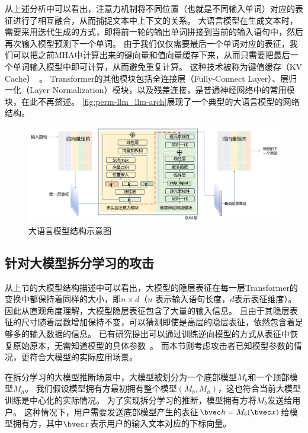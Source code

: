从上述分析中可以看出，注意力机制将不同位置（也就是不同输入单词）对应的表征进行了相互融合，从而捕捉文本中上下文的关系。
%
大语言模型在生成文本时，需要采用迭代生成的方式，即将前一轮的输出单词拼接到当前的输入语句中，然后再次输入模型预测下一个单词。
%
由于我们仅仅需要最后一个单词对应的表征，我们可以把之前MHA中计算出来的键向量和值向量缓存下来，从而只需要把最后一个单词输入模型中即可计算，从而避免重复计算。
%
这种技术被称为键值缓存（KV Cache）~\cite{pope_2023_efficiently_kv_cache}。
%
Transformer的其他模块包括全连接层（Fully-Connect Layer）、层归一化（Layer Normalization）模块，以及残差连接，是普通神经网络中的常用模块，在此不再赘述。
%
\autoref{fig:perm-llm_llm-arch}展现了一个典型的大语言模型的网络结构。

\begin{figure}[htbp]
    \centering
    \includegraphics[width=\linewidth]{Z_Resources/perm-llm_llm-architecture.png}
    \caption{大语言模型结构示意图}
    \label{fig:perm-llm_llm-arch}
\end{figure}


\subsection{针对大模型拆分学习的攻击}
从上节的大模型结构描述中可以看出，大模型的隐层表征在每一层Transformer的变换中都保持着同样的大小，即$n \times d$（$n$ 表示输入语句长度，$d$表示表征维度）。
%
因此从直观角度理解，大模型隐层表征包含了大量的输入信息。
且由于其隐层表征的尺寸随着层数增加保持不变，可以猜测即使是高层的隐层表征，依然包含着足够多的输入数据的信息。
%
已有研究提出可以通过训练逆向模型的方式从表征中恢复原始原本，无需知道模型的具体参数~\cite{morris2023embedding_almost}。
而本节则考虑攻击者已知模型参数的情况，更符合大模型的实际应用场景。


在拆分学习的大模型推断场景中，大模型被划分为一个底部模型$M_b$和一个顶部模型$M_h$。
%
我们假设模型拥有方最初拥有整个模型$(M_b, M_h)$，这也符合当前大模型训练是中心化的实际情况。
%
为了实现拆分学习的推断，模型拥有方将$M_b$发送给用户。
%
这种情况下，用户需要发送底部模型产生的表征$\bvec h = M_b(\bvec x)$给模型拥有方，其中$\bvec x$表示用户的输入文本对应的下标向量。

